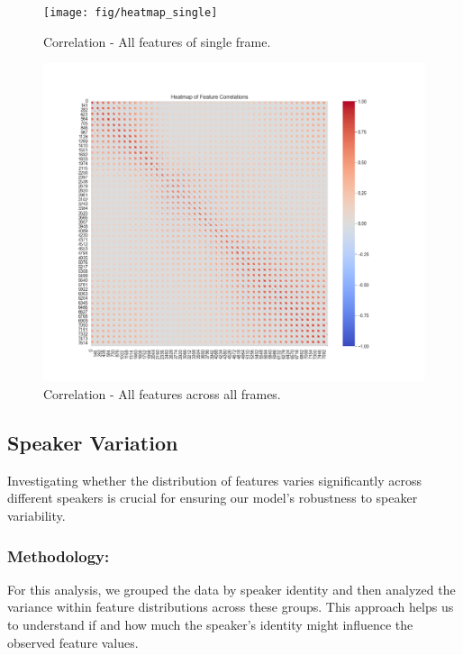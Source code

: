 \begin{figure}[!ht]
	\centering
	\begin{minipage}{0.49\textwidth}
		\centering
		\texttt{[image: fig/heatmap\_single]}
		\caption{Correlation - All features of single frame.}
		\label{fig:HeatmapSingle}
	\end{minipage}\hfill
	\begin{minipage}{0.49\textwidth}
		\centering
		\includegraphics[scale=0.21]{fig/heatmap_all}
		\caption{Correlation - All features across all frames.}
		\label{fig:HeatmapAll}
	\end{minipage}
\end{figure}

\subsection{Speaker Variation}

Investigating whether the distribution of features varies significantly across different speakers is crucial for ensuring our model's robustness to speaker variability.

\subsubsection{Methodology:}

For this analysis, we grouped the data by speaker identity and then analyzed the variance within feature distributions across these groups.
This approach helps us to understand if and how much the speaker's identity might influence the observed feature values.

